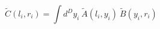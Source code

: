 \begin{equation}\label{eq105:ps}
	\widetilde{C}(l_{i},r_{i})=\int d^{D}y_{i}~ \widetilde{A}(l_{i},y_{i})~\widetilde{B}(y_{i},r_{i})
\end{equation}

